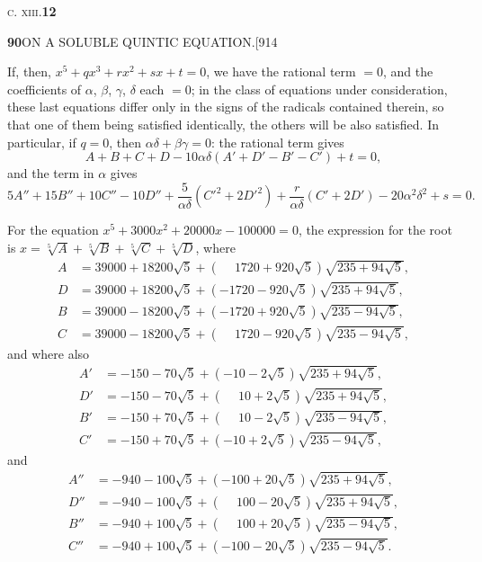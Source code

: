 \documentclass[11pt]{article}
\begin{document}
\hfill\textsc{c. xiii.}\hfill\textbf{12}

\newpage
\noindent\textbf{90}\hfill ON A SOLUBLE QUINTIC EQUATION.\hfill[914

\smallskip
\hspace{1em} If, then, $x^{5}+qx^{3}+rx^{2}+sx+t=0$, we have the rational
term $=0$, and the coefficients of $\alpha$, $\beta$, $\gamma$, $\delta$ each
$=0$; in the class of equations under consideration, these last equations
differ only in the signs of the radicals contained therein, so that one of
them being satisfied identically, the others will be also satisfied. In
particular, if $q=0$, then $\alpha\delta+\beta\gamma=0$: the rational term
gives
\[
A+B+C+D-10\alpha\delta(A'+D'-B'-C')+t=0,
\]
and the term in $\alpha$ gives
\[
5A''+15B''+10C''-10D''+\frac{5}{\alpha\delta}(C'^{2}+2D'^{2})+\frac{r}{\alpha\delta}(C'+2D')-20\alpha^{2}\delta^{2}+s=0.
\]

For the equation $x^{5}+3000x^{2}+20000x-100000=0$, the expression for the
root is $x=\sqrt[5]{A}+\sqrt[5]{B}+\sqrt[5]{C}+\sqrt[5]{D}$, where
\[
\begin{aligned}
A &= 39000+18200\sqrt{5}+(\phantom{-}1720+920\sqrt{5})\sqrt{235+94\sqrt{5}},\\
D &= 39000+18200\sqrt{5}+(-1720-920\sqrt{5})\sqrt{235+94\sqrt{5}},\\
B &= 39000-18200\sqrt{5}+(-1720+920\sqrt{5})\sqrt{235-94\sqrt{5}},\\
C &= 39000-18200\sqrt{5}+(\phantom{-}1720-920\sqrt{5})\sqrt{235-94\sqrt{5}},
\end{aligned}
\]
and where also
\[
\begin{aligned}
A' &= -150-70\sqrt{5}+(-10-2\sqrt{5})\sqrt{235+94\sqrt{5}},\\
D' &= -150-70\sqrt{5}+(\phantom{-}10+2\sqrt{5})\sqrt{235+94\sqrt{5}},\\
B' &= -150+70\sqrt{5}+(\phantom{-}10-2\sqrt{5})\sqrt{235-94\sqrt{5}},\\
C' &= -150+70\sqrt{5}+(-10+2\sqrt{5})\sqrt{235-94\sqrt{5}},
\end{aligned}
\]
and
\[
\begin{aligned}
A'' &= -940-100\sqrt{5}+(-100+20\sqrt{5})\sqrt{235+94\sqrt{5}},\\
D'' &= -940-100\sqrt{5}+(\phantom{-}100-20\sqrt{5})\sqrt{235+94\sqrt{5}},\\
B'' &= -940+100\sqrt{5}+(\phantom{-}100+20\sqrt{5})\sqrt{235-94\sqrt{5}},\\
C'' &= -940+100\sqrt{5}+(-100-20\sqrt{5})\sqrt{235-94\sqrt{5}}.
\end{aligned}
\]
\end{document}
